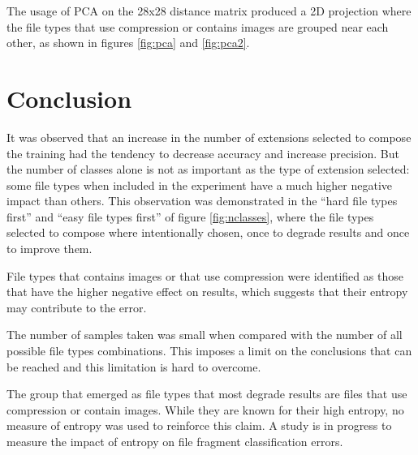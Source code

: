 
The usage of PCA on the 28x28 distance matrix produced a 2D projection where the file types that use compression or contains images are grouped near each other, as shown in figures \ref{fig:pca} and \ref{fig:pca2}.


\section{Conclusion}
It was observed that an increase in the number of extensions selected to compose the training had the tendency to decrease accuracy and increase precision. But the number of classes alone is not as important as the type of extension selected: some file types when included in the experiment have a much higher negative impact than others. This observation was demonstrated in the ``hard file types first'' and ``easy file types first'' of figure \ref{fig:nclasses}, where the file types selected to compose  where intentionally chosen, once to degrade results and once to improve them.

File types that contains images or that use compression were identified as those that have the higher negative effect on results, which suggests that their entropy may contribute to the error.


The number of samples taken was small when compared with the number of all possible file types combinations. This imposes a limit on the conclusions that can be reached and this limitation is hard to overcome.

The group that emerged as file types that most degrade results are files that use compression or contain images. While they are known for their high entropy, no measure of entropy was used to reinforce this claim. A study is in progress to measure the impact of entropy on file fragment classification errors.